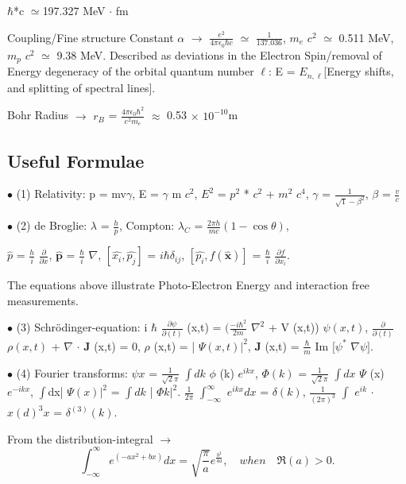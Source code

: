 \documentclass[a4paper, 10pt, onepage]{elegantbook}
\begin{document}
{$\hbar$*c $\simeq$197.327 MeV $ \cdot$ fm  

Coupling/Fine structure Constant $\alpha$ $\rightarrow$ $\frac{e^2}{4 \pi 
\epsilon_0 \hbar c}$ $\simeq$ $\frac{1}{137.036}$, $m_e$ $c^2$ $\simeq$ 0.511 MeV, $m_p$ $c^2$ $\simeq$ 9.38 MeV.
Described as deviations in the Electron Spin/removal of Energy degeneracy of the orbital quantum number $\ell$:
E = $E_{n,\ell}$[Energy shifts, and splitting of spectral lines]. 

Bohr Radius $\longrightarrow$ $r_B$ = $\frac{4 \pi \epsilon_0 \hbar^2}{e^2{m_e}}$ $\approx$ 0.53 $\times$ $10^{-10}$m

\subsection{Useful Formulae}

$\bullet$  (1) Relativity: p = mv$\gamma$, E = $\gamma$ m $c^2$, $E^2$ = $p^2$ * $c^2$ + $m^2$ $c^4$, $\gamma$ = 
$\frac{1}{\sqrt1 - \beta^2}$,
$\beta$ = $\frac{v}{c}$  

$\bullet$ (2) de Broglie: $\lambda$ = $\frac{h}{p}$,  
Compton: $\lambda_C$ = $\frac{2 \pi h}{mc}(1 - \cos \theta)$,  

\noindent
$\hat{p}$ = $\frac{h}{i}$ $\frac{\partial}{\partial x}$,  
$\hat{\mathbf p}$ = $\frac{\hbar}{i}$ $\nabla$,  
$[\hat{x_i},\hat{p_j}]$ = $i\hbar \delta_{ij}$,  
$[\hat{p_i},f(\hat{\mathbf x})]$ = $\frac{\hbar}{i}$ $\frac{\partial{f}} {\partial{x_i}}$.  

The equations above illustrate Photo-Electron Energy and interaction free measurements.  

$\bullet$ (3) Schr\"odinger-equation:  
i $\hbar$ $\frac{\partial \psi}{\partial(t)}$ (x,t) =  $(\frac{- i \hbar^2}{2 m}$ $\nabla^2$ + V (x,t)) $\psi (x,t)$,  
$\frac{\partial}{\partial(t)}$ $\rho (x,t)$ + $\nabla$ $\cdot$ $\mathbf J$ (x,t) = 0,   
$\rho$ (x,t) = | $\Psi (x,t) |^2$,  
$\mathbf J$ (x,t) = $\frac{\hbar} {m}$ Im $[\psi^*$ $\nabla \psi]$. 

$\bullet$ (4) Fourier transforms:  
$\psi x$ = $\frac{1}{\sqrt2 \pi}$ $\int{dk}$ $\phi$ (k) $e^{ikx}$, $\Phi (k)$ = $\frac{1}{\sqrt2\pi}$ $\int{dx}$ $\Psi$ 
(x) $e^{-ikx}$, 
$\int${dx}| $\Psi (x) |^2$ = $\int {dk}$ | $\Phi k |^2$. 
$\frac{1}{2\pi}$ $\int_ {-\infty}^{\infty}$ $e^{ikx}{dx}$ = $\delta(k)$, 
$\frac{1}{(2\pi)^3}$ $\int$ $e^{ik}$ $\cdot$ ${x}(d)^3{x}$ = $\delta^{(3)}(k)$.  
  
From the distribution-integral $\rightarrow$
\begin{equation}
\int_{-\infty}^{\infty} e^{(-ax^2 + bx)} dx = \sqrt{ \frac{\pi}{a}} e^{\frac{b^2}{4a}}, \quad when \quad \Re{(a)} > 0.
\end{equation}

}
\end{document}
